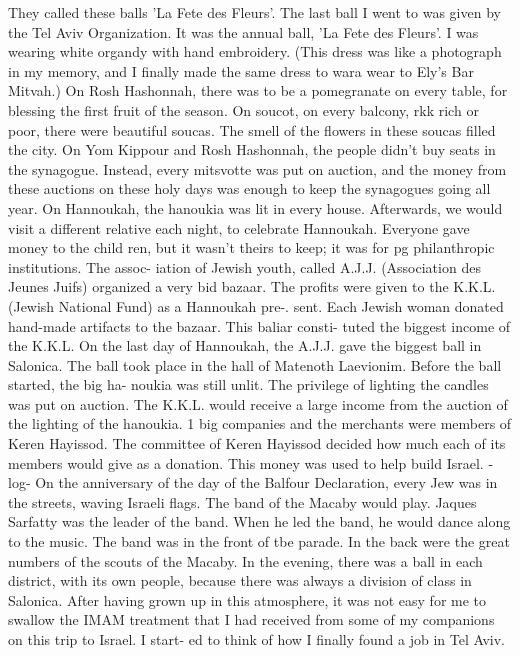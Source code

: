 {{They called these balls 'La Fete des Fleurs'. The last ball I went to was given by the 
Tel Aviv Organization. It was the annual ball, 'La Fete des Fleurs'. I was wearing 
white organdy with hand embroidery. (This dress was like a photograph in my memory, and 
I finally made the same dress to wara wear to Ely's Bar Mitvah.) 
On Rosh Hashonnah, there was to be a pomegranate on every table, for blessing the 
first fruit of the season. On soucot, on every balcony, rkk rich or poor, there were 
beautiful soucas. The smell of the flowers in these soucas filled the city. On Yom 
Kippour and Rosh Hashonnah, the people didn't buy seats in the synagogue. Instead, every 
mitsvotte was put on auction, and the money from these auctions on these holy days was 
enough to keep the synagogues going all year. 
On Hannoukah, the hanoukia was lit in every house. Afterwards, we would visit a 
different relative each night, to celebrate Hannoukah. Everyone gave money to the child 
ren, but it wasn't theirs to keep; it was for pg philanthropic institutions. The assoc-
iation of Jewish youth, called A.J.J. (Association des Jeunes Juifs) organized a very bid 
bazaar. The profits were given to the K.K.L. (Jewish National Fund) as a Hannoukah pre-. 
sent. Each Jewish woman donated hand-made artifacts to the bazaar. This baliar consti-
tuted the biggest income of the K.K.L. 
On the last day of Hannoukah, the A.J.J. gave the biggest ball in Salonica. The 
ball took place in the hall of Matenoth Laevionim. Before the ball started, the big ha-
noukia was still unlit. The privilege of lighting the candles was put on auction. The 
K.K.L. would receive a large income from the auction of the lighting of the hanoukia. 1 
big companies and the merchants were members of Keren Hayissod. The committee of Keren 
Hayissod decided how much each of its members would give as a donation. This money was 
used to help build Israel. 
-log-
On the anniversary of the day of the Balfour Declaration, every Jew was in the 
streets, waving Israeli flags. The band of the Macaby would play. Jaques Sarfatty was 
the leader of the band. When he led the band, he would dance along to the music. The 
band was in the front of tbe parade. In the back were the great numbers of the scouts 
of the Macaby. In the evening, there was a ball in each district, with its own people, 
because there was always a division of class in Salonica. 
After having grown up in this atmosphere, it was not easy for me to swallow the IMAM 
treatment that I had received from some of my companions on this trip to Israel. I start-
ed to think of how I finally found a job in Tel Aviv. 
}}
